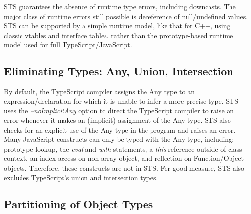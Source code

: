 STS guarantees the absence of runtime type errors, including downcasts.
The major class of runtime errors still possible is dereference of null/undefined values. 
STS can be supported by a simple runtime model, like that for C++, using classic vtables and interface tables,
rather than the prototype-based runtime model used for full TypeScript/JavaScript.

\subsection{Eliminating Types: Any, Union, Intersection}

By default, the TypeScript compiler assigns the Any type to an expression/declaration for which it is unable to 
infer a more precise type. STS uses the \emph{--noImplicitAny} option to direct the TypeScript compiler to raise an error 
whenever it makes an (implicit) assignment of the Any type.  STS also checks for an explicit use of the Any type in
the program and raises an error. Many JavaScript constructs can only be typed with the Any type, including: prototype lookup,
the \emph{eval} and \emph{with} statements, a \emph{this} reference outside of class context, an index access on non-array object, and
reflection on Function/Object objects. Therefore, these constructs are not in STS. For good measure,
STS also excludes TypeScript's union and intersection types.

\subsection{Partitioning of Object Types}

